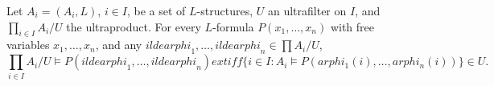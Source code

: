 Let $A_i = (A_i, L)$, $i \in I$, be a set of $L$-structures, $U$ an ultrafilter on $I$, and $\prod_{i \in I} A_i / U$ the ultraproduct. For every $L$-formula $P(x_1,\ldots,x_n)$ with free variables $x_1,\ldots,x_n$, and any $	ilde{arphi}_1,\ldots,	ilde{arphi}_n \in \prod A_i / U$,
$$\prod_{i \in I} A_i / U \models P(	ilde{arphi}_1,\ldots,	ilde{arphi}_n) 	ext{ iff } \{i \in I : A_i \models P(arphi_1(i),\ldots,arphi_n(i))\} \in U.$$
